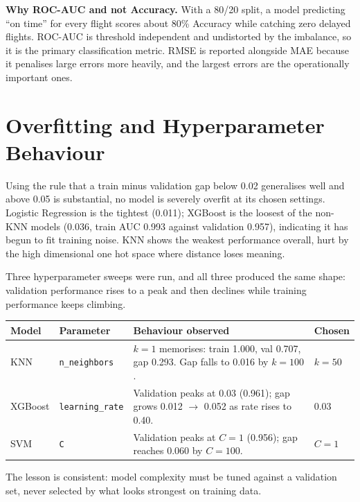 \documentclass[11pt,a4paper]{article}
\begin{document}
\textbf{Why ROC-AUC and not Accuracy.} With a 80/20 split, a model predicting ``on time''
for every flight scores about 80\% Accuracy while catching zero delayed flights. ROC-AUC
is threshold independent and undistorted by the imbalance, so it is the primary
classification metric. RMSE is reported alongside MAE because it penalises large errors
more heavily, and the largest errors are the operationally important ones.

\section{Overfitting and Hyperparameter Behaviour}

Using the rule that a train minus validation gap below 0.02 generalises well and above
0.05 is substantial, no model is severely overfit at its chosen settings. Logistic
Regression is the tightest (0.011); XGBoost is the loosest of the non-KNN models (0.036,
train AUC 0.993 against validation 0.957), indicating it has begun to fit training
noise. KNN shows the weakest performance overall, hurt by the high dimensional one hot
space where distance loses meaning.

Three hyperparameter sweeps were run, and all three produced the same shape: validation
performance rises to a peak and then declines while training performance keeps climbing.

\begin{center}
\small
\begin{tabular}{@{}l l l l@{}}
\toprule
\textbf{Model} & \textbf{Parameter} & \textbf{Behaviour observed} & \textbf{Chosen} \\
\midrule
KNN & \texttt{n\_neighbors} &
$k{=}1$ memorises: train 1.000, val 0.707, gap 0.293. Gap falls to 0.016 by $k{=}100$. &
$k=50$ \\
XGBoost & \texttt{learning\_rate} &
Validation peaks at 0.03 (0.961); gap grows 0.012 $\rightarrow$ 0.052 as rate rises to 0.40. &
0.03 \\
SVM & \texttt{C} &
Validation peaks at $C{=}1$ (0.956); gap reaches 0.060 by $C{=}100$. &
$C=1$ \\
\bottomrule
\end{tabular}
\end{center}

The lesson is consistent: model complexity must be tuned against a validation set, never
selected by what looks strongest on training data.
\end{document}

